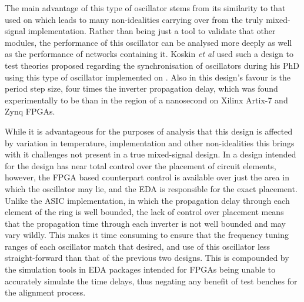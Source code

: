 The main advantage of this type of oscillator stems from its similarity to that used on  which leads to many non-idealities carrying over from the truly mixed-signal implementation. Rather than being just a tool to validate that other modules, the performance of this oscillator can be analysed more deeply as well as the performance of networks containing it. Koskin \textit{et al} used such a design to test theories proposed regarding the synchronisation of oscillators during his PhD using this type of oscillator implemented on  \cite{koskin2019phd,theboys2019}. Also in this design's favour is the period step size, four times the inverter propagation delay, which was found experimentally to be than in the region of a nanosecond on Xilinx Artix-7 and Zynq \acp{FPGA}.

While it is advantageous for the purposes of analysis that this design is affected by variation in temperature, implementation and other non-idealities this brings with it challenges not present in a true mixed-signal design. In a design intended for  the design has near total control over the placement of circuit elements, however, the \ac{FPGA} based counterpart control is available over just the area in which the oscillator may lie, and the \ac{EDA} is responsible for the exact placement. Unlike the \ac{ASIC} implementation, in which the propagation delay through each element of the ring is well bounded, the lack of control over placement means that the propagation time through each inverter is not well bounded and may vary wildly. This makes it time consuming to ensure that the frequency tuning ranges of each oscillator match that desired, and use of this oscillator less straight-forward than that of the previous two designs. This is compounded by the simulation tools in \ac{EDA} packages intended for \acp{FPGA} being unable to accurately simulate the time delays, thus negating any benefit of test benches for the alignment process.

